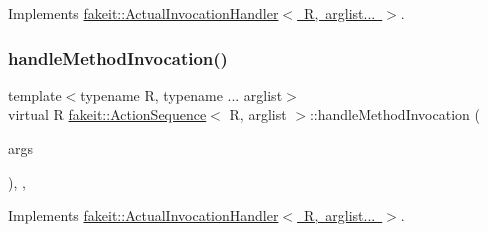 Implements \mbox{\hyperlink{structfakeit_1_1ActualInvocationHandler_ad44424f6b71c6d5587e80057771d1717}{fakeit\+::\+Actual\+Invocation\+Handler$<$ R, arglist... $>$}}.

\mbox{\label{structfakeit_1_1ActionSequence_a7bc46308e2c35fe407f30045d4ce05a0}} 
\subsubsection{\texorpdfstring{handleMethodInvocation()}{handleMethodInvocation()}\hspace{0.1cm}{\footnotesize\ttfamily [3/9]}}
{\footnotesize\ttfamily template$<$typename R, typename ... arglist$>$ \\
virtual R \mbox{\hyperlink{structfakeit_1_1ActionSequence}{fakeit\+::\+Action\+Sequence}}$<$ R, arglist $>$\+::handle\+Method\+Invocation (\begin{DoxyParamCaption}\item[{\mbox{\hyperlink{namespacefakeit_a476a37a598825e1b5dd67b3a176491a1}{Arguments\+Tuple}}$<$ arglist... $>$ \&}]{args }\end{DoxyParamCaption})\hspace{0.3cm}{\ttfamily [inline]}, {\ttfamily [override]}, {\ttfamily [virtual]}}



Implements \mbox{\hyperlink{structfakeit_1_1ActualInvocationHandler_ad44424f6b71c6d5587e80057771d1717}{fakeit\+::\+Actual\+Invocation\+Handler$<$ R, arglist... $>$}}.

\mbox{\label{structfakeit_1_1ActionSequence_a7bc46308e2c35fe407f30045d4ce05a0}} 
